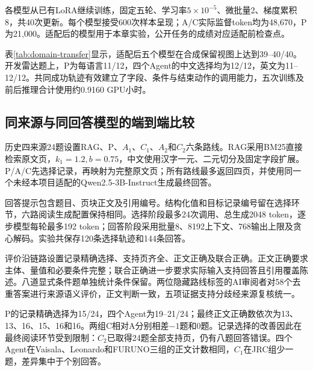 各模型从已有LoRA继续训练，固定五轮、学习率$5\times10^{-5}$、微批量2、梯度累积8，共40次更新。每个模型接受600次样本呈现；A/C实际监督token均为48,670，P为21,000。适配后的模型用于本章实验，公开任务的成绩对应适配前检查点。

\begin{table}[htbp]
\centering\small
\caption{共同适配前后的记录精确选择数；开发题每语言12题，合成保留部分为40个双语视图}
\label{tab:domain-transfer}
\resizebox{\linewidth}{!}{\DomainTransferTable}
\end{table}

表\ref{tab:domain-transfer}显示，适配后五个模型在合成保留视图上达到39--40/40。开发雷达题上，P为每语言11/12，四个Agent的中文选择均为12/12，英文为11--12/12。共同成功轨迹有效建立了字段、条件与结束动作的调用能力，五次训练及前后推理合计使用约0.9160 GPU小时。

\subsection{同来源与同回答模型的端到端比较}

历史四来源24题设置RAG、P、$A_1$、$C_1$、$A_2$和$C_2$六条路线。RAG采用BM25直接检索原文页，$k_1=1.2,b=0.75$，中文使用汉字一元、二元切分及固定字段扩展。P/A/C先选择记录，再映射为完整原文页；所有路线最多返回四页，并使用同一个未经本项目适配的Qwen2.5-3B-Instruct生成最终回答。

回答提示包含题目、页块正文及引用编号。结构化值和目标记录编号留在选择环节，六路阅读生成配置保持相同。选择阶段最多24次调用、总生成2048 token，逐步模型每轮最多192 token；回答阶段采用批量8、8192上下文、768输出上限及贪心解码。实验共保存120条选择轨迹和144条回答。

评价沿链路设置记录精确选择、支持页齐全、正文正确及联合正确。正文正确要求主体、量值和必要条件完整；联合正确进一步要求实际输入支持回答且引用覆盖陈述。八道显式条件题单独统计条件保留。两位隐藏路线标签的AI审阅者对58个去重答案进行来源语义评价，正文判断一致，五项证据支持分歧经来源复核统一。

\begin{table}[htbp]
\centering\small
\caption{六路线端到端问答结果；除条件列外分母为24}
\label{tab:domain-answer}
\resizebox{\linewidth}{!}{\DomainAnswerTable}
\end{table}

P的记录精确选择为15/24，四个Agent为19--21/24；最终正文正确数依次为13、13、16、15、16和16。两组C相对A分别相差$-1$题和0题。记录选择的改善因此在最终阅读环节受到限制：$C_2$已取得24题全部支持页，仍有八题回答错误。四个Agent在Vaisala、Leonardo和FURUNO三组的正文计数相同，$C_1$在JRC组少一题，差异集中于个别回答。

